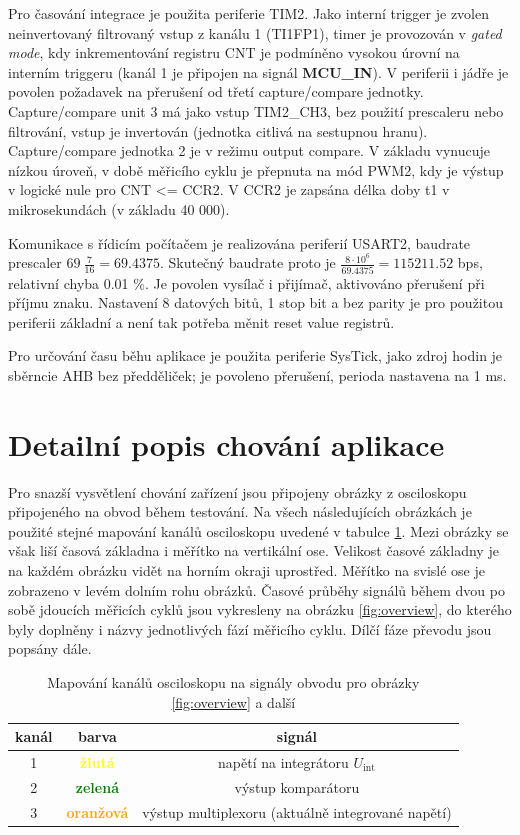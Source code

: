 \documentclass[twoside]{article}
\begin{document}
Pro časování integrace je použita periferie TIM2. Jako interní trigger je zvolen neinvertovaný filtrovaný vstup z kanálu 1 (TI1FP1),
timer je provozován v \textit{gated mode}, kdy inkrementování registru CNT je podmíněno vysokou úrovní na interním triggeru (kanál 1 je připojen na signál \textbf{MCU\_IN}).
V periferii i jádře je povolen požadavek na přerušení od třetí capture/compare jednotky. Capture/compare unit 3 má jako vstup TIM2\_CH3, bez použití prescaleru nebo filtrování,
vstup je invertován (jednotka citlivá na sestupnou hranu). Capture/compare jednotka 2 je v režimu output compare. V základu vynucuje nízkou úroveň, v době měřicího cyklu je přepnuta na mód PWM2,
kdy je výstup v logické nule pro CNT <= CCR2. V CCR2 je zapsána délka doby t1 v mikrosekundách (v základu 40 000).

Komunikace s řídicím počítačem je realizována periferií USART2, baudrate prescaler $69~\frac{7}{16} = 69.4375$. Skutečný baudrate proto je $\frac{8\cdot 10^6}{69.4375} = 115211.52$ bps,
relativní chyba 0.01 \%. Je povolen vysílač i přijímač, aktivováno přerušení při příjmu znaku. Nastavení 8 datových bitů, 1 stop bit a bez parity je pro použitou periferii základní
a není tak potřeba měnit reset value registrů.

Pro určování času běhu aplikace je použita periferie SysTick, jako zdroj hodin je sběrncie AHB bez předděliček; je povoleno přerušení, perioda nastavena na 1 ms.


\section{Detailní popis chování aplikace}
\label{sec:detail}
Pro snazší vysvětlení chování zařízení jsou připojeny obrázky z osciloskopu připojeného na obvod během testování.
Na všech následujících obrázkách je použité stejné mapování kanálů osciloskopu uvedené v tabulce \ref{table:oscilloscope}.
Mezi obrázky se však liší časová základna i měřítko na vertikální ose. Velikost časové základny je na každém obrázku vidět
na horním okraji uprostřed. Měřítko na svislé ose je zobrazeno v levém dolním rohu obrázků.
Časové průběhy signálů během dvou po sobě jdoucích měřicích cyklů jsou vykresleny na obrázku \ref{fig:overview},
do kterého byly doplněny i názvy jednotlivých fází měřicího cyklu. Dílčí fáze převodu jsou popsány dále.

\begin{table}
    \centering
    \begin{tabular}{c|c|c}
        \textbf{kanál} & \textbf{barva} & \textbf{signál} \\ \hline
        1 & \textcolor{yellow}{\textbf{žlutá}} & napětí na integrátoru $U_{\text{int}}$ \\
        2 & \textcolor{green}{\textbf{zelená}} & výstup komparátoru \\
        3 & \textcolor{orange}{\textbf{oranžová}} & výstup multiplexoru (aktuálně integrované napětí)
    \end{tabular}
    \caption{Mapování kanálů osciloskopu na signály obvodu pro obrázky \ref{fig:overview} a další}
    \label{table:oscilloscope}
\end{table}
\end{document}
